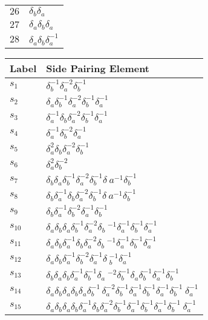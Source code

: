 \documentclass{article}
\begin{document}
\begin{center}
\begin{tabular}{ll}
$26$ & $\delta_b^{}\delta_a^{}$ \\
$27$ & $\delta_a^{}\delta_b^{}\delta_a^{}$ \\
$28$ & $\delta_a^{}\delta_b^{}\delta_a^{-1}$ \\
\bottomrule
\end{tabular}
\hfill
\begin{tabular}{ll}
\toprule
Label & Side Pairing Element\\
\midrule
$s_{1}$ & $\delta_b^{-1}\delta_a^{-2}\delta_b^{-1}$ \\
$s_{2}$ & $\delta_a^{}\delta_b^{-1}\delta_a^{-2}\delta_b^{-1}\delta_a^{-1}$ \\
$s_{3}$ & $\delta_a^{-1}\delta_b^{}\delta_a^{-2}\delta_b^{-1}\delta_a^{-1}$ \\
$s_{4}$ & $\delta_a^{-1}\delta_b^{-2}\delta_a^{-1}$ \\
$s_{5}$ & $\delta_a^{2}\delta_b^{}\delta_a^{-2}\delta_b^{-1}$ \\
$s_{6}$ & $\delta_a^{2}\delta_b^{-2}$ \\
$s_{7}$ & $\delta_b^{}\delta_a^{}\delta_b^{-1}\delta_a^{-2}\delta_b^{-1}\delta_\
a^{-1}\delta_b^{-1}$ \\
$s_{8}$ & $\delta_b^{}\delta_a^{-1}\delta_b^{}\delta_a^{-2}\delta_b^{-1}\delta_\
a^{-1}\delta_b^{-1}$ \\
$s_{9}$ & $\delta_b^{}\delta_a^{-1}\delta_b^{-2}\delta_a^{-1}\delta_b^{-1}$ \\
$s_{10}$ & $\delta_a^{}\delta_b^{}\delta_a^{}\delta_b^{-1}\delta_a^{-2}\delta_b\
^{-1}\delta_a^{-1}\delta_b^{-1}\delta_a^{-1}$ \\
$s_{11}$ & $\delta_a^{}\delta_b^{}\delta_a^{-1}\delta_b^{}\delta_a^{-2}\delta_b\
^{-1}\delta_a^{-1}\delta_b^{-1}\delta_a^{-1}$ \\
$s_{12}$ & $\delta_a^{}\delta_b^{}\delta_a^{-1}\delta_b^{-2}\delta_a^{-1}\delta\
_b^{-1}\delta_a^{-1}$ \\
$s_{13}$ & $\delta_b^{}\delta_a^{}\delta_b^{}\delta_a^{-1}\delta_b^{-1}\delta_a\
^{-2}\delta_b^{-1}\delta_a^{}\delta_b^{-1}\delta_a^{-1}\delta_b^{-1}$ \\
$s_{14}$ & $\delta_a^{}\delta_b^{}\delta_a^{}\delta_b^{}\delta_a^{}\delta_b^{-1\
}\delta_a^{-2}\delta_b^{-1}\delta_a^{-1}\delta_b^{-1}\delta_a^{-1}\delta_b^{-1}\
\delta_a^{-1}$ \\
$s_{15}$ & $\delta_a^{}\delta_b^{}\delta_a^{}\delta_b^{}\delta_a^{-1}\delta_b^{\
}\delta_a^{-2}\delta_b^{-1}\delta_a^{-1}\delta_b^{-1}\delta_a^{-1}\delta_b^{-1}\
\delta_a^{-1}$ \\

\end{tabular}
\end{center}
\end{document}

